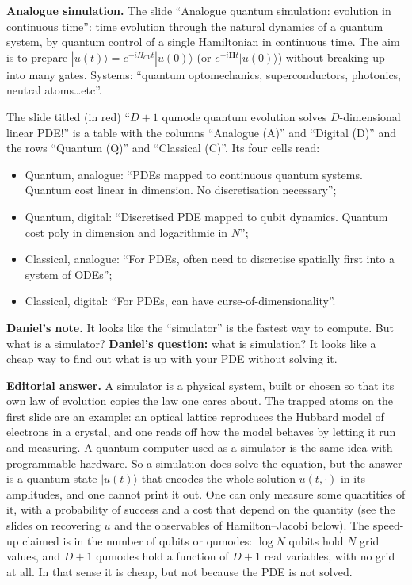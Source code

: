 \medskip\noindent
{\bf Analogue simulation.}
The slide ``Analogue quantum simulation:
evolution in continuous time'': time
evolution through the natural dynamics of a
quantum system, by quantum control of a single
Hamiltonian in continuous time. The aim is to
prepare $|u(t)\rangle=e^{-iH_{CV}t}|u(0)\rangle$
(or $e^{-i\mathbf{H}t}|u(0)\rangle$) without
breaking up into many gates. Systems:
``quantum optomechanics, superconductors,
photonics, neutral atoms\dots etc''.

\begin{remark}
\label{remark-liu-qaq-table}
The slide titled (in red) ``$D+1$ qumode
quantum evolution solves $D$-dimensional
linear PDE!'' is a table with the columns
``Analogue (A)'' and ``Digital (D)'' and the
rows ``Quantum (Q)'' and ``Classical (C)''.
Its four cells read:
\begin{itemize}
\item Quantum, analogue: ``PDEs mapped to
continuous quantum systems. Quantum cost
linear in dimension. No discretisation
necessary'';

\item Quantum, digital: ``Discretised PDE
mapped to qubit dynamics. Quantum cost poly
in dimension and logarithmic in $N$'';

\item Classical, analogue: ``For PDEs, often
need to discretise spatially first into a
system of ODEs'';

\item Classical, digital: ``For PDEs, can have
curse-of-dimensionality''.
\end{itemize}
\end{remark}

\medskip\noindent
{\bf Daniel's note.}
It looks like the ``simulator'' is the fastest
way to compute. But what is a simulator?
{\bf Daniel's question:} what is simulation?
It looks like a cheap way to find out what is
up with your PDE without solving it.

\medskip\noindent
{\bf Editorial answer.}
A simulator is a physical system, built or
chosen so that its own law of evolution
copies the law one cares about. The trapped
atoms on the first slide are an example: an
optical lattice reproduces the Hubbard model
of electrons in a crystal, and one reads off
how the model behaves by letting it run and
measuring. A quantum computer used as a
simulator is the same idea with programmable
hardware. So a simulation does solve the
equation, but the answer is a quantum state
$|u(t)\rangle$ that encodes the whole
solution $u(t,\cdot)$ in its amplitudes, and
one cannot print it out. One can only measure
some quantities of it, with a probability of
success and a cost that depend on the
quantity (see the slides on recovering
$u$ and the observables of Hamilton--Jacobi
below). The speed-up claimed is in the number
of qubits or qumodes: $\log N$ qubits hold
$N$ grid values, and $D+1$ qumodes hold a
function of $D+1$ real variables, with no grid
at all. In that sense it is cheap, but not
because the PDE is not solved.

